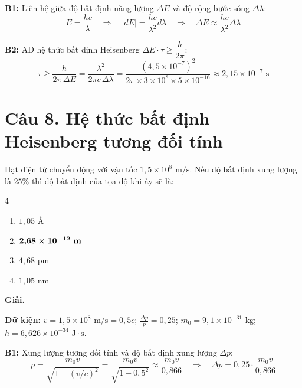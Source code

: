 \documentclass[11pt,a4paper]{article}
\begin{document}
\textbf{B1:} Liên hệ giữa độ bất định năng lượng $\Delta E$ và độ rộng bước sóng $\Delta\lambda$:
\begin{equation*}
    E = \frac{hc}{\lambda} \quad \Longrightarrow \quad |dE| = \frac{hc}{\lambda^2} d\lambda \quad \Longrightarrow \quad \Delta E \approx \frac{hc}{\lambda^2} \Delta\lambda
\end{equation*}

\textbf{B2:} AD hệ thức bất định Heisenberg $\Delta E \cdot \tau \ge \dfrac{h}{2\pi}$:
\begin{equation*}
    \tau \ge \frac{h}{2\pi \, \Delta E} = \frac{\lambda^2}{2\pi c \, \Delta\lambda} = \frac{(4{,}5 \times 10^{-7})^2}{2\pi \times 3 \times 10^8 \times 5 \times 10^{-16}} \approx 2{,}15 \times 10^{-7}\text{ s}
\end{equation*}

\vspace{0.5cm}

\section*{Câu 8. Hệ thức bất định Heisenberg tương đối tính}

Hạt điện tử chuyển động với vận tốc $1{,}5 \times 10^8\text{ m/s}$. Nếu độ bất định xung lượng là $25\%$ thì độ bất định của tọa độ khi ấy sẽ là:

\begin{multicols}{4}
\begin{enumerate}[label=\Alph*., itemsep=1pt, topsep=1pt, parsep=0pt, leftmargin=1.8em]
    \item $1{,}05\text{ \AA}$
    \item $\boldsymbol{2{,}68 \times 10^{-12}\text{ \textbf{m}}}$
    \item $4{,}68\text{ pm}$
    \item $1{,}05\text{ nm}$
\end{enumerate}
\end{multicols}

\textbf{Giải.}

\textbf{Dữ kiện:} $v = 1{,}5 \times 10^8\text{ m/s} = 0{,}5c$; $\frac{\Delta p}{p} = 0{,}25$; $m_0 = 9{,}1 \times 10^{-31}\text{ kg}$; $h = 6{,}626 \times 10^{-34}\text{ J}\cdot\text{s}$.

\textbf{B1:} Xung lượng tương đối tính và độ bất định xung lượng $\Delta p$:
\begin{equation*}
    p = \frac{m_0 v}{\sqrt{1 - (v/c)^2}} = \frac{m_0 v}{\sqrt{1 - 0{,}5^2}} \approx \frac{m_0 v}{0{,}866} \quad \Longrightarrow \quad \Delta p = 0{,}25 \cdot \frac{m_0 v}{0{,}866}
\end{equation*}
\end{document}
